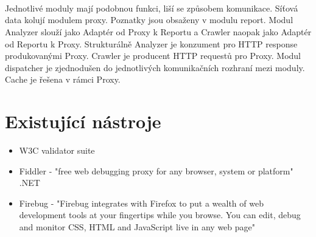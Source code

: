 \documentclass[10pt]{article}
\begin{document}
\paragraph{~}Jednotliv\'e moduly maj\'i podobnou funkci, li\v{s}\'i se zp\r{u}sobem komunikace. S\'i\v{t}ov\'a data koluj\'i modulem proxy. Poznatky jsou obsa\v{z}eny v modulu report. Modul Analyzer slou\v{z}\'i jako Adapt\'er od Proxy k Reportu a Crawler naopak jako Adapt\'er od Reportu k Proxy. Struktur\'aln\v{e} Analyzer je konzument pro HTTP response produkovan\'ymi Proxy. Crawler je producent HTTP request\r{u} pro Proxy. Modul dispatcher je zjednodu\v{s}en do jednotliv\'ych komunika\v{c}n\'ich rozhran\'i mezi moduly. Cache je \v{r}e\v{s}ena v r\'amci Proxy.
\section{Existuj\'ic\'i n\'astroje}
\begin{itemize}
	\item W3C validator suite
	\item Fiddler - "free web debugging proxy for any browser, system or platform" .NET
	\item Firebug - "Firebug integrates with Firefox to put a wealth of web development tools at your fingertips while you browse. You can edit, debug and monitor CSS, HTML and JavaScript live in any web page"
\end{itemize}	
\end{document}
